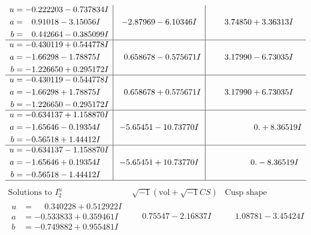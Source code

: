 \documentclass[1p]{elsarticle_modified}
\theoremstyle{definition}
\newcommand{\I}{\sqrt{-1}}
\begin{document}
$$\begin{array}{c|c|c}
\begin{aligned}
u &= -0.222203 - 0.737834 I \\
a &= \phantom{-}0.91018 - 3.15056 I \\
b &= \phantom{-}0.442664 - 0.385099 I\end{aligned}
 & -2.87969 - 6.10346 I & \phantom{-}3.74850 + 3.36313 I \\ \hline\begin{aligned}
u &= -0.430119 + 0.544778 I \\
a &= -1.66298 - 1.78875 I \\
b &= -1.226650 + 0.295172 I\end{aligned}
 & \phantom{-}0.658678 - 0.575671 I & \phantom{-}3.17990 - 6.73035 I \\ \hline\begin{aligned}
u &= -0.430119 - 0.544778 I \\
a &= -1.66298 + 1.78875 I \\
b &= -1.226650 - 0.295172 I\end{aligned}
 & \phantom{-}0.658678 + 0.575671 I & \phantom{-}3.17990 + 6.73035 I \\ \hline\begin{aligned}
u &= -0.634137 + 1.158870 I \\
a &= -1.65646 - 0.19354 I \\
b &= -0.56518 + 1.44412 I\end{aligned}
 & -5.65451 - 10.73770 I & \phantom{-0.000000 -}0. + 8.36519 I \\ \hline\begin{aligned}
u &= -0.634137 - 1.158870 I \\
a &= -1.65646 + 0.19354 I \\
b &= -0.56518 - 1.44412 I\end{aligned}
 & -5.65451 + 10.73770 I & \phantom{-0.000000 } 0. - 8.36519 I\\
 \hline 
 \end{array}$$\newpage$$\begin{array}{c|c|c}  
\text{Solutions to }I^u_{2}& \I (\text{vol} + \sqrt{-1}CS) & \text{Cusp shape}\\
 \hline 
\begin{aligned}
u &= \phantom{-}0.340228 + 0.512922 I \\
a &= -0.533833 + 0.359461 I \\
b &= -0.749882 + 0.955481 I\end{aligned}
 & \phantom{-}0.75547 - 2.16837 I & \phantom{-}1.08781 - 3.45424 I \\ \hline\begin{aligned}

\end{aligned}
\end{array}$$
\end{document}
